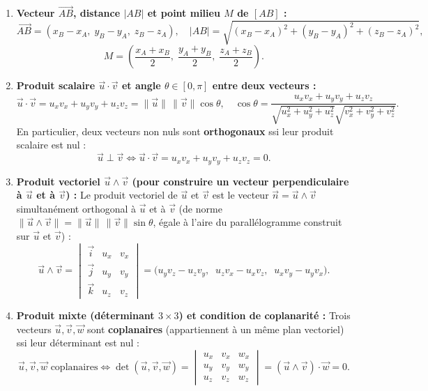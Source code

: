 \begin{theoreme}
\begin{enumerate}
    \item \textbf{Vecteur $\overrightarrow{AB}$, distance $|AB|$ et point milieu $M$ de $[AB]$ :}
    \[
        \overrightarrow{AB} = (x_B - x_A,\; y_B - y_A,\; z_B - z_A), \quad |AB| = \sqrt{(x_B-x_A)^2 + (y_B-y_A)^2 + (z_B-z_A)^2},
    \]
    \[
        M = \left(\frac{x_A+x_B}{2},\; \frac{y_A+y_B}{2},\; \frac{z_A+z_B}{2}\right).
    \]
    \item \textbf{Produit scalaire $\vec{u} \cdot \vec{v}$ et angle $\theta \in [0,\pi]$ entre deux vecteurs :}
    \[
        \boxed{\vec{u} \cdot \vec{v} = u_x v_x + u_y v_y + u_z v_z = \|\vec{u}\|\,\|\vec{v}\|\cos\theta}, \quad \cos\theta = \frac{u_x v_x + u_y v_y + u_z v_z}{\sqrt{u_x^2+u_y^2+u_z^2}\sqrt{v_x^2+v_y^2+v_z^2}}.
    \]
    En particulier, deux vecteurs non nuls sont \textbf{orthogonaux} ssi leur produit scalaire est nul :
    \[
        \boxed{\vec{u} \perp \vec{v} \iff \vec{u} \cdot \vec{v} = u_x v_x + u_y v_y + u_z v_z = 0}.
    \]
    \item \textbf{Produit vectoriel $\vec{u} \wedge \vec{v}$ (pour construire un vecteur perpendiculaire à $\vec{u}$ et à $\vec{v}$) :}
    Le produit vectoriel de $\vec{u}$ et $\vec{v}$ est le vecteur $\vec{n} = \vec{u} \wedge \vec{v}$ simultanément orthogonal à $\vec{u}$ et à $\vec{v}$ (de norme $\|\vec{u}\wedge\vec{v}\| = \|\vec{u}\|\,\|\vec{v}\|\sin\theta$, égale à l'aire du parallélogramme construit sur $\vec{u}$ et $\vec{v}$) :
    \[
        \boxed{\vec{u} \wedge \vec{v} = \begin{vmatrix} \vec{i} & u_x & v_x \\ \vec{j} & u_y & v_y \\ \vec{k} & u_z & v_z \end{vmatrix} = \bigl(u_y v_z - u_z v_y,\;\; u_z v_x - u_x v_z,\;\; u_x v_y - u_y v_x\bigr)}.
    \]
    \item \textbf{Produit mixte (déterminant $3 \times 3$) et condition de coplanarité :}
    Trois vecteurs $\vec{u}, \vec{v}, \vec{w}$ sont \textbf{coplanaires} (appartiennent à un même plan vectoriel) ssi leur déterminant est nul :
    \[
        \boxed{\vec{u}, \vec{v}, \vec{w} \text{ coplanaires} \iff \det(\vec{u}, \vec{v}, \vec{w}) = \begin{vmatrix} u_x & v_x & w_x \\ u_y & v_y & w_y \\ u_z & v_z & w_z \end{vmatrix} = (\vec{u} \wedge \vec{v}) \cdot \vec{w} = 0}.
    \]
\end{enumerate}
\end{theoreme}

